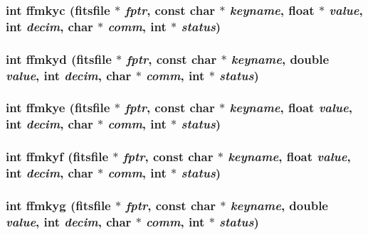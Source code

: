 \subsubsection{\setlength{\rightskip}{0pt plus 5cm}int ffmkyc (\bf{fitsfile} $\ast$ {\em fptr}, const char $\ast$ {\em keyname}, float $\ast$ {\em value}, int {\em decim}, char $\ast$ {\em comm}, int $\ast$ {\em status})}\label{fitsio__64_8h_7e6d14931514dc9721cfc11506d550cf}


\subsubsection{\setlength{\rightskip}{0pt plus 5cm}int ffmkyd (\bf{fitsfile} $\ast$ {\em fptr}, const char $\ast$ {\em keyname}, double {\em value}, int {\em decim}, char $\ast$ {\em comm}, int $\ast$ {\em status})}\label{fitsio__64_8h_2f427b6b25fee401214df98e56ebc429}


\subsubsection{\setlength{\rightskip}{0pt plus 5cm}int ffmkye (\bf{fitsfile} $\ast$ {\em fptr}, const char $\ast$ {\em keyname}, float {\em value}, int {\em decim}, char $\ast$ {\em comm}, int $\ast$ {\em status})}\label{fitsio__64_8h_84fa2097111d3805d61b197d7a00ee78}


\subsubsection{\setlength{\rightskip}{0pt plus 5cm}int ffmkyf (\bf{fitsfile} $\ast$ {\em fptr}, const char $\ast$ {\em keyname}, float {\em value}, int {\em decim}, char $\ast$ {\em comm}, int $\ast$ {\em status})}\label{fitsio__64_8h_a6e96904c21b62c82a78f38a345e7b39}


\subsubsection{\setlength{\rightskip}{0pt plus 5cm}int ffmkyg (\bf{fitsfile} $\ast$ {\em fptr}, const char $\ast$ {\em keyname}, double {\em value}, int {\em decim}, char $\ast$ {\em comm}, int $\ast$ {\em status})}\label{fitsio__64_8h_cfca16506886068b451f7a977934509b}


